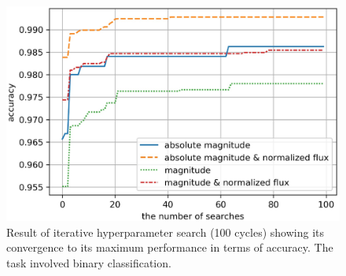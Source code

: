 \documentclass[useamsfonts]{pasj01}
\begin{document}
\begin{figure}[htbp]
  \begin{center}
     \includegraphics[width=\columnwidth]{figures/hp_iterations_accuracy.eps}
  \end{center}
  \caption{%
  Result of iterative hyperparameter search (100 cycles) showing its convergence to its maximum performance in terms of accuracy. The task involved binary classification.
  }%
  \label{fig:hp_test}
\end{figure}
%
%
%
\end{document}
